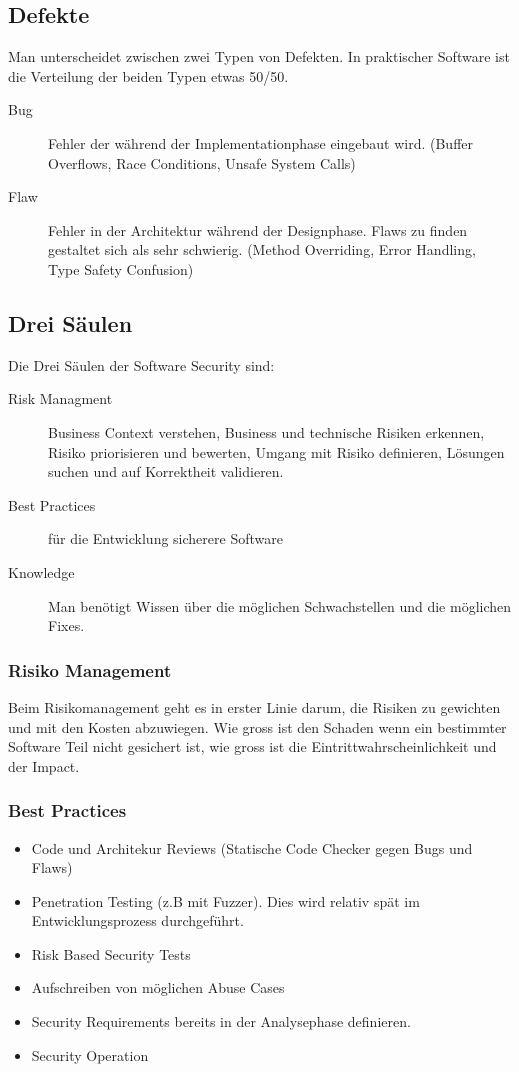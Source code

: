 \subsection{Defekte}
Man unterscheidet zwischen zwei Typen von Defekten. In praktischer Software ist die Verteilung der beiden Typen etwas 50/50.
\begin{description}
	\item[Bug] Fehler der während der Implementationphase eingebaut wird. (Buffer Overflows, Race Conditions, Unsafe System Calls)
	\item[Flaw] Fehler in der Architektur während der Designphase. Flaws zu finden gestaltet sich als sehr schwierig. (Method Overriding, Error Handling, Type Safety Confusion)
\end{description}

\subsection{Drei Säulen}
Die Drei Säulen der Software Security sind:

\begin{description}
	\item[Risk Managment] Business Context verstehen, Business und technische Risiken erkennen, Risiko priorisieren und bewerten, Umgang mit Risiko definieren, Lösungen suchen und auf Korrektheit validieren.
	\item[Best Practices] für die Entwicklung sicherere Software
	\item[Knowledge] Man benötigt Wissen über die möglichen Schwachstellen und die möglichen Fixes.
\end{description}

\subsubsection{Risiko Management}
Beim Risikomanagement geht es in erster Linie darum, die Risiken zu gewichten und mit den Kosten abzuwiegen. Wie gross ist den Schaden wenn ein bestimmter Software Teil nicht gesichert ist, wie gross ist die Eintrittwahrscheinlichkeit und der Impact.

\subsubsection{Best Practices}
\begin{itemize}
	\item Code und Architekur Reviews (Statische Code Checker gegen Bugs und Flaws)
	\item Penetration Testing (z.B mit Fuzzer). Dies wird relativ spät im Entwicklungsprozess durchgeführt.
	\item Risk Based Security Tests
	\item Aufschreiben von möglichen Abuse Cases
	\item Security Requirements bereits in der Analysephase definieren.
	\item Security Operation
\end{itemize}

